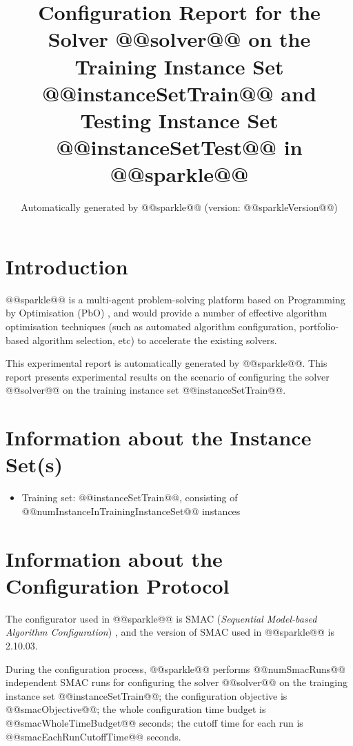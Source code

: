 \documentclass[british]{article}
\title{Configuration Report for the Solver @@solver@@ on the Training Instance Set @@instanceSetTrain@@ \iftest and Testing Instance Set @@instanceSetTest@@ \fi in @@sparkle@@ }
\author{ Automatically generated by @@sparkle@@ (version: @@sparkleVersion@@) }
\newif\iftest
\begin{document}
\maketitle %


\section{Introduction}
\label{sec:Introduction}

@@sparkle@@ \cite{Hoos15} is a multi-agent problem-solving platform based on Programming by Optimisation (PbO) \cite{Hoos12}, and would provide a number of effective algorithm optimisation techniques (such as automated algorithm configuration, portfolio-based algorithm selection, etc) to accelerate the existing solvers.

This experimental report is automatically generated by @@sparkle@@. This report presents experimental results on the scenario of configuring the solver @@solver@@ on the training instance set @@instanceSetTrain@@\iftest~and evaluating it on the testing instance set @@instanceSetTest@@\fi.

\section{Information about the Instance Set(s)}

\begin{itemize}
\item Training set: @@instanceSetTrain@@, consisting of @@numInstanceInTrainingInstanceSet@@ instances
\iftest\item Testing set: @@instanceSetTest@@, consisting of @@numInstanceInTestingInstanceSet@@ instances\fi
\end{itemize}

\section{Information about the Configuration Protocol}

The configurator used in @@sparkle@@ is SMAC ({\em Sequential Model-based Algorithm Configuration}) \cite{HutEtAl11}, and the version of SMAC used in @@sparkle@@ is 2.10.03.

During the configuration process, @@sparkle@@ performs @@numSmacRuns@@ independent SMAC runs for configuring the solver @@solver@@ on the trainging instance set @@instanceSetTrain@@; the configuration objective is @@smacObjective@@; the whole configuration time budget is @@smacWholeTimeBudget@@ seconds; the cutoff time for each run is @@smacEachRunCutoffTime@@ seconds.
\end{document}
